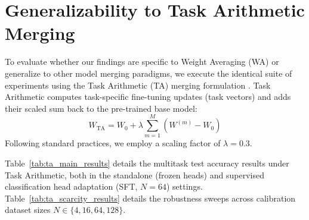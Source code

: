 \documentclass{article}
\theoremstyle{plain}
\theoremstyle{definition}
\theoremstyle{remark}
\begin{document}
\section{Generalizability to Task Arithmetic Merging}
\label{app:task_arithmetic}
To evaluate whether our findings are specific to Weight Averaging (WA) or generalize to other model merging paradigms, we execute the identical suite of experiments using the Task Arithmetic (TA) merging formulation \cite{Ilharco2022b}. Task Arithmetic computes task-specific fine-tuning updates (task vectors) and adds their scaled sum back to the pre-trained base model:
\begin{equation}
    W_{\text{TA}} = W_0 + \lambda \sum_{m=1}^{M} (W^{(m)} - W_0)
\end{equation}
Following standard practices, we employ a scaling factor of $\lambda = 0.3$. 

Table~\ref{tab:ta_main_results} details the multitask test accuracy results under Task Arithmetic, both in the standalone (frozen heads) and supervised classification head adaptation (SFT, $N=64$) settings. Table~\ref{tab:ta_scarcity_results} details the robustness sweeps across calibration dataset sizes $N \in \{4, 16, 64, 128\}$.
\end{document}
